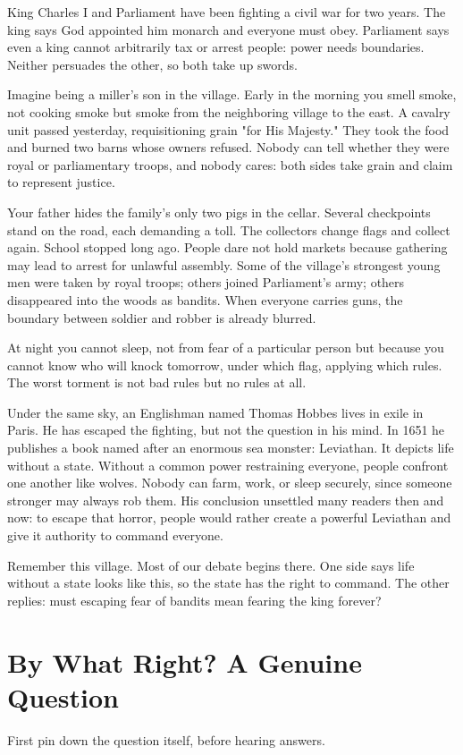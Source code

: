 King Charles I and Parliament have been fighting a civil war for two years. The king says God appointed him monarch and everyone must obey. Parliament says even a king cannot arbitrarily tax or arrest people: power needs boundaries. Neither persuades the other, so both take up swords.

Imagine being a miller's son in the village. Early in the morning you smell smoke, not cooking smoke but smoke from the neighboring village to the east. A cavalry unit passed yesterday, requisitioning grain "for His Majesty." They took the food and burned two barns whose owners refused. Nobody can tell whether they were royal or parliamentary troops, and nobody cares: both sides take grain and claim to represent justice.

Your father hides the family's only two pigs in the cellar. Several checkpoints stand on the road, each demanding a toll. The collectors change flags and collect again. School stopped long ago. People dare not hold markets because gathering may lead to arrest for unlawful assembly. Some of the village's strongest young men were taken by royal troops; others joined Parliament's army; others disappeared into the woods as bandits. When everyone carries guns, the boundary between soldier and robber is already blurred.

At night you cannot sleep, not from fear of a particular person but because you cannot know who will knock tomorrow, under which flag, applying which rules. The worst torment is not bad rules but no rules at all.

Under the same sky, an Englishman named Thomas Hobbes lives in exile in Paris. He has escaped the fighting, but not the question in his mind. In 1651 he publishes a book named after an enormous sea monster: Leviathan. It depicts life without a state. Without a common power restraining everyone, people confront one another like wolves. Nobody can farm, work, or sleep securely, since someone stronger may always rob them. His conclusion unsettled many readers then and now: to escape that horror, people would rather create a powerful Leviathan and give it authority to command everyone.

Remember this village. Most of our debate begins there. One side says life without a state looks like this, so the state has the right to command. The other replies: must escaping fear of bandits mean fearing the king forever?

\section{By What Right? A Genuine Question}
First pin down the question itself, before hearing answers.

